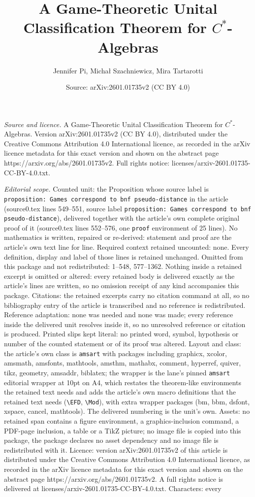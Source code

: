 \documentclass[10pt,a4paper]{amsart}
\title[A Game-Theoretic Unital Classification Theorem for $C^*$-Alg]{A Game-Theoretic Unital Classification Theorem for $C^*$-Algebras}
\author{Jennifer Pi, Micha{\l} Szachniewicz, Mira Tartarotti}
\date{Source: arXiv:2601.01735v2 (CC BY 4.0)}
\begin{document}
\maketitle

\noindent\emph{Source and licence.} A Game-Theoretic Unital Classification Theorem for $C^*$-Algebras. Version arXiv:2601.01735v2 (CC BY 4.0), distributed under the Creative Commons Attribution 4.0 International licence, as recorded in the arXiv licence metadata for this exact version and shown on the abstract page https://arxiv.org/abs/2601.01735v2. Full rights notice: licenses/arxiv-2601.01735-CC-BY-4.0.txt.\par\smallskip

\noindent\textit{Editorial scope.} Counted unit: the Proposition whose source label is \texttt{proposition: Games correspond to bnf pseudo-distance} in the article (source0.tex lines 549--551, source label \texttt{proposition: Games correspond to bnf pseudo-distance}), delivered together with the article's own complete original proof of it (source0.tex lines 552--576, one \texttt{proof} environment of 25 lines). No mathematics is written, repaired or re-derived: statement and proof are the article's own text line for line. Required context retained uncounted: none. Every definition, display and label of those lines is retained unchanged. Omitted from this package and not redistributed: 1--548, 577--1362. Nothing inside a retained excerpt is omitted or altered: every retained body is delivered exactly as the article's lines are written, so no omission receipt of any kind accompanies this package. Citations: the retained excerpts carry no citation command at all, so no bibliography entry of the article is transcribed and no reference is redistributed. Reference adaptation: none was needed and none was made; every reference inside the delivered unit resolves inside it, so no unresolved reference or citation is produced. Printed slips kept literal: no printed word, symbol, hypothesis or number of the counted statement or of its proof was altered. Layout and class: the article's own class is \texttt{amsart} with packages including graphicx, xcolor, amsmath, amsfonts, mathtools, amsthm, mathabx, comment, hyperref, quiver, tikz, geometry, amsaddr, biblatex; the wrapper is the lane's pinned \texttt{amsart} editorial wrapper at 10pt on A4, which restates the theorem-like environments the retained text needs and adds the article's own macro definitions that the retained text needs (\texttt{\textbackslash EFD}, \texttt{\textbackslash Mod}), with extra wrapper packages (bm, bbm, dsfont, xspace, cancel, mathtools). The delivered numbering is the unit's own. Assets: no retained span contains a figure environment, a graphics-inclusion command, a PDF-page inclusion, a table or a TikZ picture; no image file is copied into this package, the package declares no asset dependency and no image file is redistributed with it. Licence: version arXiv:2601.01735v2 of this article is distributed under the Creative Commons Attribution 4.0 International licence, as recorded in the arXiv licence metadata for this exact version and shown on the abstract page https://arxiv.org/abs/2601.01735v2. A full rights notice is delivered at licenses/arxiv-2601.01735-CC-BY-4.0.txt. Characters: every 
\end{document}
